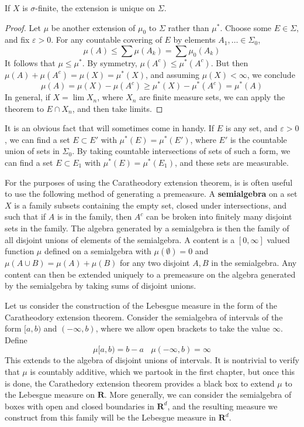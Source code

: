 \begin{corollary}
    If $X$ is $\sigma$-finite, the extension is unique on $\Sigma$.
\end{corollary}
\begin{proof}
    Let $\mu$ be another extension of $\mu_0$ to $\Sigma$ rather than $\mu^*$. Choose some $E \in \Sigma$, and fix $\varepsilon > 0$. For any countable covering of $E$ by elements $A_1, \dots \in \Sigma_0$,
    \[ \mu(A) \leq \sum \mu(A_k) = \sum \mu_0(A_k) \]
    It follows that $\mu \leq \mu^*$. By symmetry, $\mu(A^c) \leq \mu^*(A^c)$. But then $\mu(A) + \mu(A^c) = \mu(X) = \mu^*(X)$, and assuming $\mu(X) < \infty$, we conclude
    \[ \mu(A) = \mu(X) - \mu(A^c) \geq \mu^*(X) - \mu^*(A^c) = \mu^*(A) \]
    In general, if $X = \lim X_n$, where $X_n$ are finite measure sets, we can apply the theorem to $E \cap X_n$, and then take limits.
\end{proof}

It is an obvious fact that will sometimes come in handy. If $E$ is any set, and $\varepsilon > 0$, we can find a set $E \subset E'$ with $\mu^*(E) = \mu^*(E')$, where $E'$ is the countable union of sets in $\Sigma_0$. By taking countable intersections of sets of such a form, we can find a set $E \subset E_1$ with $\mu^*(E) = \mu^*(E_1)$, and these sets are measurable.

For the purposes of using the Caratheodory extension theorem, is is often useful to use the following method of generating a premeasure. A {\bf semialgebra} on a set $X$ is a family subsets containing the empty set, closed under intersections, and such that if $A$ is in the family, then $A^c$ can be broken into finitely many disjoint sets in the family. The algebra generated by a semialgebra is then the family of all disjoint unions of elements of the semialgebra. A content is a $[0,\infty]$ valued function $\mu$ defined on a semialgebra with $\mu(\emptyset) = 0$ and $\mu(A \cup B) = \mu(A) + \mu(B)$ for any two disjoint $A,B$ in the semialgebra. Any content can then be extended uniquely to a premeasure on the algebra generated by the semialgebra by taking sums of disjoint unions.

\begin{example}
    Let us consider the construction of the Lebesgue measure in the form of the Caratheodory extension theorem. Consider the semialgebra of intervals of the form $[a,b)$ and $(-\infty,b)$, where we allow open brackets to take the value $\infty$. Define
    \[ \mu [a,b) = b-a\ \ \ \ \mu(-\infty,b) = \infty \]
    This extends to the algebra of disjoint unions of intervals. It is nontrivial to verify that $\mu$ is countably additive, which we partook in the first chapter, but once this is done, the Carathedory extension theorem provides a black box to extend $\mu$ to the Lebesgue measure on $\mathbf{R}$. More generally, we can consider the semialgebra of boxes with open and closed boundaries in $\mathbf{R}^d$, and the resulting measure we construct from this family will be the Lebesgue measure in $\mathbf{R}^d$.
\end{example}

